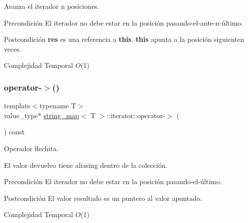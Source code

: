 Avanza el iterador n posiciones. 

\begin{DoxyPrecond}{Precondición}
El iterador no debe estar en la posición pasando-\/el-\/ante-\/n-\/último. 
\end{DoxyPrecond}
\begin{DoxyPostcond}{Postcondición}
{\bfseries res} es una referencia a {\bfseries this}. {\bfseries this} apunta a la posición siguienten veces.
\end{DoxyPostcond}

\begin{DoxyDescription}
\item[Complejidad Temporal]$O$(1)
\end{DoxyDescription}\mbox{\label{classstring__map_1_1iterator_a45053b6d360c1a5fd5918dc91604c38f}} 
\subsubsection{\texorpdfstring{operator-\/$>$()}{operator->()}}
{\footnotesize\ttfamily template$<$typename T$>$ \\
value\+\_\+type$\ast$ \mbox{\hyperlink{classstring__map}{string\+\_\+map}}$<$ T $>$\+::iterator\+::operator-\/$>$ (\begin{DoxyParamCaption}{ }\end{DoxyParamCaption}) const\hspace{0.3cm}{\ttfamily [inline]}}



Operador flechita. 

El valor devuelvo tiene aliasing dentro de la colección.

\begin{DoxyPrecond}{Precondición}
El iterador no debe estar en la posición pasando-\/el-\/último. 
\end{DoxyPrecond}
\begin{DoxyPostcond}{Postcondición}
El valor resultado es un puntero al valor apuntado.
\end{DoxyPostcond}

\begin{DoxyDescription}
\item[Complejidad Temporal]$O$(1)
\end{DoxyDescription}\mbox{\label{classstring__map_1_1iterator_a89370874c0a2a3fcc6b6980851b32525}} 
